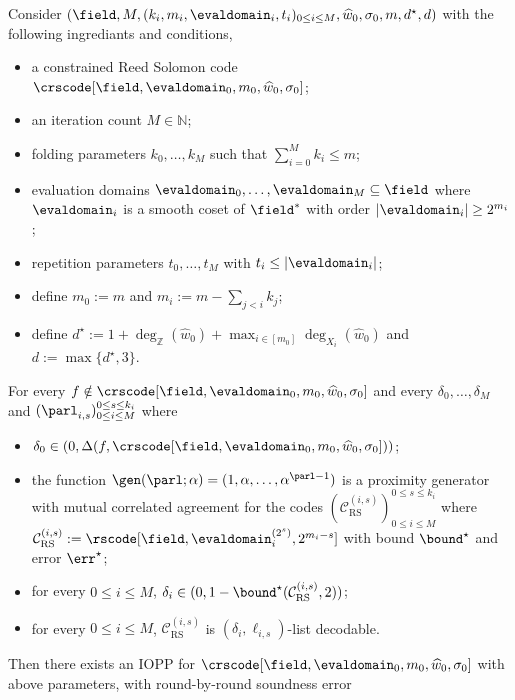 \begin{theorem}\label{thm: whir_rbr_soundness}
    Consider $(\field, M, (k_i, m_i, \evaldomain_i, t_i)_{0 \leq i \leq M}, \widehat{w}_0, \sigma_0, m, d^\star, d)$ with the following ingrediants and conditions,
    \begin{itemize}
    \item a constrained Reed Solomon code $\crscode[\field, \evaldomain_0, m_0, \widehat{w}_0, \sigma_0]$;
    \item an iteration count $M \in \mathbb{N}$;
    \item folding parameters $k_0, \ldots, k_{M}$ such that $\sum_{i=0}^{M} k_i \leq m$;
    \item evaluation domains $\evaldomain_0, \ldots, \evaldomain_{M} \subseteq \field$ where $\evaldomain_i$ is a smooth coset of $\field^*$ with order $|\evaldomain_i| \geq 2^{m_i}$;
    \item repetition parameters $t_0, \ldots, t_M$ with $t_i \leq |\evaldomain_i|$;
    \item define $m_0 := m$ and $m_i := m - \sum_{j < i} k_j$;
    \item define $d^\star := 1 + \deg_{\mathbb{Z}}(\widehat{w}_0) + \max_{i \in [m_0]} \deg_{X_i}(\widehat{w}_0)$ and $d := \max\{d^\star, 3\}$.
    \end{itemize}
    For every $f \notin \crscode[\field, \evaldomain_0, m_0, \widehat{w}_0, \sigma_0]$ and every $\delta_0, \dots, \delta_{M}$ and $(\parl_{i,s})_{0 \leq i \leq M}^{0 \leq s \leq k_i}$ where
    \begin{itemize}
        \item $\delta_0 \in (0, \Delta(f, \crscode[\field, \evaldomain_0, m_0, \widehat{w}_0, \sigma_0]))$;
        \item the function $\gen(\parl; \alpha) = (1, \alpha, \dots, \alpha^{\parl-1})$ is a proximity generator with mutual correlated agreement for the codes $(\mathcal{C}_{\mathrm{RS}}^{(i,s)})_{0 \leq i \leq M}^{0 \leq s \leq k_i}$ where $\mathcal{C}_{\mathrm{RS}}^{(i,s)} := \rscode[\field, \evaldomain_i^{(2^s)}, 2^{m_i - s}]$ with bound ${\bound}^\star$ and error $\err^\star$;
        \item for every $0 \leq i \le M$, $\delta_i \in (0, 1 - {\bound}^\star(\mathcal{C}_{\mathrm{RS}}^{(i,s)}, 2))$;
        \item for every $0 \leq i \le M$, $\mathcal{C}_{\mathrm{RS}}^{(i,s)}$ is $(\delta_i, \ell_{i,s})$-list decodable.
    \end{itemize}
   Then there exists an IOPP for $\crscode[\field, \evaldomain_0, m_0, \widehat{w}_0, \sigma_0]$ with above parameters, with round-by-round soundness error


\end{theorem}
